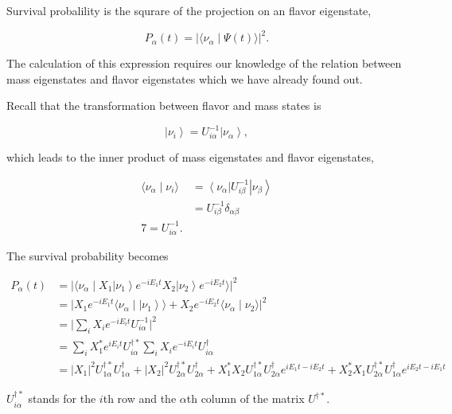 \documentclass{tufte-handout}
\newcommand{\bra}[1]{\left\langle #1\right|}
\newcommand{\ket}[1]{\left| #1\right\rangle}
\newcommand{\braket}[2]{\langle #1 \mid #2 \rangle}
\begin{document}
Survival probalility is the squrare of the projection on an flavor eigenstate,

\begin{equation}
P_{\alpha}(t) = \lvert \braket{\nu_{\alpha}}{\Psi(t)} \rvert^2.
\end{equation}

The calculation of this expression requires our knowledge of the relation between mass eigenstates and flavor eigenstates which we have already found out.

Recall that the transformation between flavor and mass states is

\begin{equation}
\ket{\nu_i} = U^{-1}_{i\alpha} \ket{\nu_\alpha},
\end{equation}

which leads to the inner product of mass eigenstates and flavor eigenstates,

\begin{align}
\braket{\nu_\alpha}{\nu_i} &= \bra{\nu_\alpha} U^{-1}_{i\beta} \ket{\nu_\beta} \\
& = U^{-1}_{i\beta}\delta_{\alpha\beta} \\
7 = U^{-1}_{i\alpha}.
\end{align}


The survival probability becomes

\begin{align*}
P_\alpha (t) &= \lvert \braket{\nu_\alpha}{ X_1 \ket{\nu_1 } e^{-i E_1 t} X_2 \ket{ \nu_2 } e^{-i E_2 t} }  \rvert^2 \\
& = \lvert  X_1 e^{-i E_1 t} \braket{\nu_\alpha}{\ket{\nu_1} } + X_2 e^{-i E_2 t} \braket{ \nu_\alpha }{ \nu_2 } \rvert^2 \\
& = \lvert \sum_i X_i e^{-i E_i t} U^{-1}_{i \alpha}  \rvert ^2 \\
& = \sum_i X_1^* e^{iE_i t} U^{\dagger *}_{i\alpha} \sum_i X_i e^{-i E_i t} U^\dagger_{i \alpha} \\
& = \lvert X_1 \rvert^2 U^{\dagger *}_{1\alpha} U^\dagger_{1\alpha} + \lvert X_2 \rvert^2 U^{\dagger *}_{2\alpha} U^\dagger_{2\alpha}  + X_1^* X_2 U^{\dagger *}_{1\alpha} U^\dagger_{2\alpha} e^{i E_1 t - i E_2 t} + X_2^* X_1 U^{\dagger *}_{2\alpha} U^\dagger_{1\alpha} e^{i E_2 t - i E_1 t}
\end{align*}


$U^{\dagger *}_{i\alpha}$ stands for the $i$th row and the $\alpha$th column of the matrix $U^{\dagger *}$. 
\end{document}

